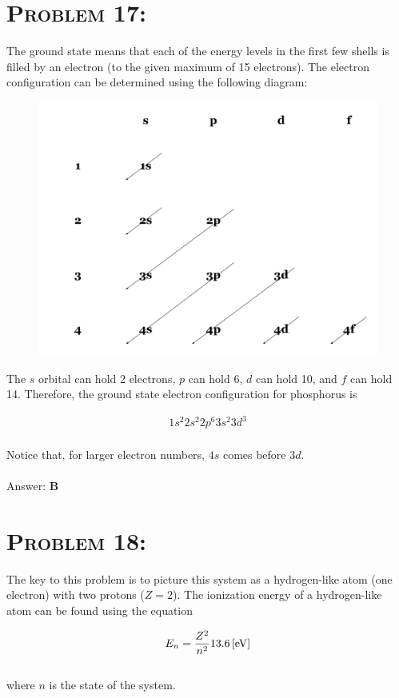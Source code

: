 \documentclass{article}
\begin{document}

\section{\textsc{Problem 17:}} The ground state means that each of the energy levels in the first few shells is filled by an electron (to the given maximum of 15 electrons). The electron configuration can be determined using the following diagram:

\begin{figure}[H]
\includegraphics[width = .50\textwidth]{Electron_Config.png}\centering
\end{figure}
 \noindent The $s$ orbital can hold 2 electrons, $p$ can hold 6, $d$ can hold 10, and $f$ can hold 14. Therefore, the ground state electron configuration for phosphorus is

 \begin{gather}
 \boxed{1s^{2} 2s^{2} 2p^{6} 3s^{2} 3d^{3}}\nonumber
 \end{gather}
 \\
 Notice that, for larger electron numbers, $4s$ comes before $3d$.
\\\\
Answer: \textbf{\textcolor{ProcessBlue}B}\\


\section{\textsc{Problem 18:}} The key to this problem is to picture this system as a hydrogen-like atom (one electron) with two protons ($Z = 2$). The ionization energy of a hydrogen-like atom can be found using the equation

\begin{gather}
E_{n} = \frac{Z^{2}}{n^{2}} \unit[13.6]{[eV]}
\end{gather}
\\
where $n$ is the state of the system.
\end{document}
